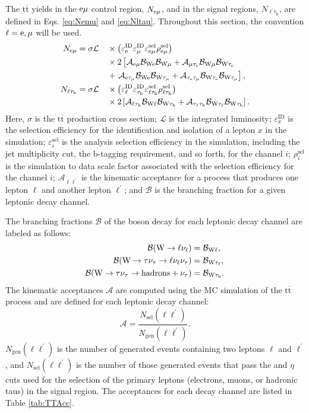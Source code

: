 \documentclass[12pt]{thesis}  %
\newcommand{\tauh}{\ensuremath{\tau_{\text{h}}}\xspace}
\newcommand{\Pe}{\ensuremath{\cmsSymbolFace{e}}\xspace}
\newcommand{\emu}{\ensuremath{\Pe\mu}\xspace}
\newcommand{\ltau}{\ensuremath{\ell\tauh}\xspace}
\renewcommand{\ttbar}{\ensuremath{\mathrm{t}\overline{\mathrm{t}}}\xspace}
\begin{document}
The \ttbar yields in the \emu control region, $N_{\emu}$, and in the signal regions, $N_{\ltau}$, are defined in Eqs. \eqref{eq:Nemu} and \eqref{eq:Nltau}. Throughout this section, the convention $\ell = \Pe, \mu$ will be used.
\begin{alignat}{2}
\label{eq:Nemu}
  N_{\emu} &= \sigma \mathcal{L} &&\times \left(\Ee \Emu \varepsilon^{\text{sel}}_{\emu} \rho^{\text{sel}}_{\emu} \right)  \nonumber \\
           &                     &&\times 2 \left[\vphantom{\Btm} \Aem\Be\Bm + \Amte\Bm\Bte \right. \\
           &                     &&+ \left. \Aetm\Be\Btm  + \Atetm\Bte\Btm \right],  \nonumber \\
 N_{\ltau} &= \sigma \mathcal{L} &&\times \left(\El \Eth \varepsilon^{\text{sel}}_{\ltau} \rho^{\text{sel}}_{\ltau} \right) \nonumber \\
           &                     &&\times 2 \left[\Alth\Bl\Bth + \Atlth\Btl\Bth \right].  \label{eq:Nltau}
\end{alignat}
Here, $\sigma$ is the \ttbar production cross section; $\mathcal{L}$ is the integrated luminosity; $\varepsilon_{x}^{\text{ID}}$ is the selection efficiency for the identification and isolation of a lepton $x$ in the simulation; $\varepsilon^{\text{sel}}_{i}$ is the analysis selection efficiency in the simulation, including the jet multiplicity cut, the b-tagging requirement, and so forth, for the channel $i$; $\rho^{\text{sel}}_{i}$ is the simulation to data scale factor associated with the selection efficiency for the channel $i$; $\mathcal{A}_{\ell\ell^{\prime}}$ is the kinematic acceptance for a process that produces one lepton $\ell$ and another lepton $\ell^{\prime}$; and $\mathcal{B}$ is the branching fraction for a given leptonic decay channel.

The branching fractions $\mathcal{B}$ of the \W boson decay for each leptonic decay channel are labeled as follows:
\begin{align}
\mathcal{B}(\W \rightarrow \ell \nu_{\ell}) &= \Bl, \\
\mathcal{B}(\W \rightarrow \tau\nu_{\tau} \rightarrow \ell \nu_{\ell} \nu_{\tau}) &= \Btl, \\
\mathcal{B}(\W \rightarrow \tau\nu_{\tau} \rightarrow \text{hadrons} + \nu_{\tau}) &= \Bth.
\end{align}
The kinematic acceptances $\mathcal{A}$ are computed using the MC simulation of the \ttbar process and are defined for each leptonic decay channel:
\begin{equation}
  \mathcal{A} = \frac{N_{\text{sel}}(\ell\ell^{\prime})}{N_{\text{gen}}(\ell\ell^{\prime})}.
\end{equation}
$N_{\text{gen}}(\ell\ell^{\prime})$ is the number of generated events containing two leptons $\ell$ and $\ell^{\prime}$, and $N_{\text{sel}}(\ell\ell^{\prime})$ is the number of those generated events that pass the \pt and $\eta$ cuts used for the selection of the primary leptons (electrons, muons, or hadronic taus) in the signal region. The acceptances for each decay channel are listed in Table \ref{tab:TTAcc}.
\end{document}
